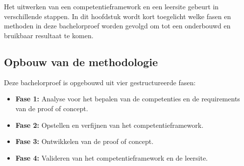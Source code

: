 
\chapter{}%
\label{ch:methodologie}




Het uitwerken van een competentieframework en een leersite gebeurt in verschillende stappen.
In dit hoofdstuk wordt kort toegelicht welke fasen en methoden in deze bachelorproef worden gevolgd
om tot een onderbouwd en bruikbaar resultaat te komen.


\section{Opbouw van de methodologie}%
\label{sec:opbouw-van-de-methodologie}

Deze bachelorproef is opgebouwd uit vier gestructureerde fasen:

\begin{itemize}
    \item \textbf{Fase 1:} Analyse voor het bepalen van de competenties en de requirements van de proof of concept.
    \item \textbf{Fase 2:} Opstellen en verfijnen van het competentieframework.
    \item \textbf{Fase 3:} Ontwikkelen van de proof of concept.
    \item \textbf{Fase 4:} Valideren van het competentieframework en de leersite.
\end{itemize}


